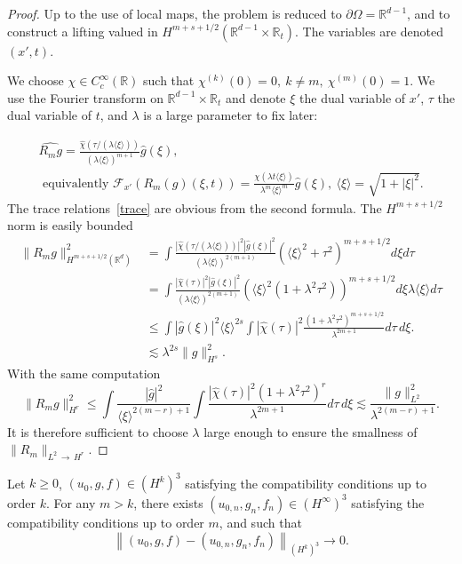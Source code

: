 \documentclass[AHL,Unicode,longabstracts,published]{cedram}
\newcommand{\R}{\mathbb{R}}
\newcommand{\clF}{\mathcal{F}}
\newcommand{\cxi}{\langle \xi\rangle}
\begin{document}
\begin{proof}
Up to the use of local maps, the problem is reduced to $\partial\Omega=\R^{d-1}$, and to construct a lifting valued in $H^{m+s+1/2}(\R^{d-1}\times \R_t)$. The variables are denoted $(x',t)$.


We choose $\chi\in C_c^\infty(\R)$ such that $\chi^{(k)}(0)=0,\ k\neq m,\ \chi^{(m)}(0)=1$. We use the Fourier transform on $\R^{d-1}\times \R_t$ and denote $\xi$ the dual variable of $x'$, $\tau$ the dual variable of $t$, and $\lambda$ is a large parameter to fix later:

\begin{multline*}
\widehat{R_mg}=\frac{\widehat{\chi}(\tau/(\lambda\langle \xi\rangle))}{(\lambda \cxi)^{m+1}}\widehat{g}(\xi),\\
\text{ equivalently }
\clF_{x'}\left(R_m(g) (\xi,t)\right)=\frac{\chi(\lambda t\langle \xi\rangle)}{\lambda^{m}\langle \xi\rangle^{m}}\widehat{g}(\xi),\
\cxi=\sqrt{1+|\xi|^2}.
\end{multline*}
The trace relations~\eqref{trace} are obvious from the second formula. The $H^{m+s+1/2}$ norm is easily bounded
\begin{align*}
\|R_mg\|_{H^{m+s+1/2}(\R^d)}^2&=\int \frac{\left|\widehat{\chi}(\tau/(\lambda\langle \xi\rangle))\right|^2|\widehat{g} (\xi)|^2} {(\lambda \cxi)^{2(m+1)}}\left(\cxi^2+\tau^2\right)^{m+s+1/2}d\xi d\tau
\\
&=\int \frac{\left|\widehat{\chi}(\tau)\right|^2|\widehat{g}(\xi)|^2}{(\lambda \cxi)^{2(m+1)}} \left(\cxi^2\left(1+\lambda^2\tau^2\right)\right)^{m+s+1/2} d\xi \lambda \cxi d\tau
\\
&\leq \int \left|\widehat{g}(\xi)\right|^2\cxi^{2s}
\int\left|\widehat{\chi}(\tau)\right|^2
\frac{\left(1+\lambda^2\tau^2\right)^{m+s+1/2}}{\lambda^{2m+1}}d\tau\,d\xi.
\\
&\lesssim \lambda^{2s}\|g\|_{H^{s}}^2.
\end{align*}
With the same computation
\[
\|R_mg\|_{H^r}^2\leq
\int \frac{|\widehat{g}|^2}{\cxi^{2(m-r)+1}}\int \frac{|\widehat{\chi}(\tau)|^2\left(1+\lambda^2
\tau^2\right)^r}{\lambda^{2m+1}}d\tau\,d\xi\lesssim
\frac{\|g\|_{L^2}^2}{\lambda^{2(m-r)+1}}.
\]
It is therefore sufficient to choose $\lambda$ large enough to ensure the smallness of\\$\|R_m\|_{L^2\,\to\,H^r}$.
\end{proof}

\begin{lemm}\label{compahaute}
Let $k\geq 0$, $(u_0,g,f)\in (H^k)^3$ satisfying the compatibility conditions up to order $k$. For any $m>k$, there exists $(u_{0,n},g_n,f_n)\in (H^\infty)^3$ satisfying the compatibility conditions up to order $m$, and such that
\[
\left\|(u_0,g,f)-(u_{0,n},g_n,f_n)\right\|_{(H^k)^3}
\to 0.
\]
\end{lemm}
\end{document}
